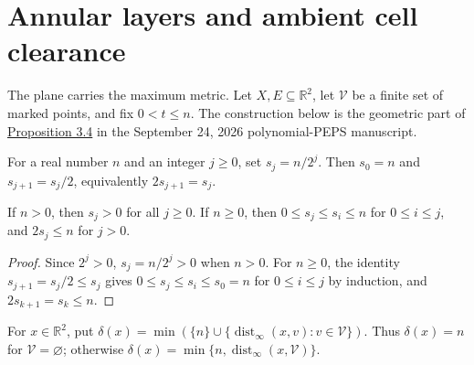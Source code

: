 \section{Annular layers and ambient cell clearance}
\label{sec:peps_angular_annular_geometry}

The plane carries the maximum metric. Let $X,E\subseteq\mathbb R^2$,
let $\mathcal V$ be a finite set of marked points, and fix $0<t\le n$.
The construction below is the geometric part of
\href{https://github.com/openai/math/blob/adc7f1241b42e322a6451854ab7e4b4c146bf78a/preprints/Polynomial-PEPS-approximation-of-gapped-square-grid-ground-states-September-24-2026/build/sections/02-information.tex\#L662-L744}{Proposition 3.4}
in the September 24, 2026 polynomial-PEPS manuscript.

\begin{definition}
    \label{def:peps_dyadic_scales}
    \leanok
    For a real number $n$ and an integer $j\ge0$, set $s_j=n/2^j$.
    Then $s_0=n$ and $s_{j+1}=s_j/2$, equivalently $2s_{j+1}=s_j$.
\end{definition}

\begin{lemma}
    \label{thm:peps_dyadic_scale_bounds}
    \leanok
    If $n>0$, then $s_j>0$ for all $j\ge0$. If $n\ge0$, then
    $0\le s_j\le s_i\le n$ for $0\le i\le j$, and $2s_j\le n$ for $j>0$.
\end{lemma}
\begin{proof}
    \leanok
    Since $2^j>0$, $s_j=n/2^j>0$ when $n>0$. For $n\ge0$, the identity
    $s_{j+1}=s_j/2\le s_j$ gives $0\le s_j\le s_i\le s_0=n$ for $0\le i\le j$ by
    induction, and $2s_{k+1}=s_k\le n$.
\end{proof}

\begin{definition}
    \label{def:peps_capped_mark_distance}
    \leanok
    For $x\in\mathbb R^2$, put
    $\delta(x)=\min(\{n\}\cup\{\operatorname{dist}_{\infty}(x,v):v\in\mathcal V\})$.
    Thus $\delta(x)=n$ for $\mathcal V=\varnothing$; otherwise
    $\delta(x)=\min\{n,\operatorname{dist}_{\infty}(x,\mathcal V)\}$.
\end{definition}

